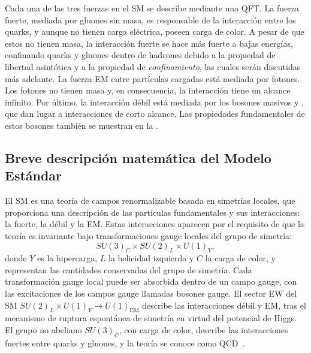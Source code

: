 Cada una de las tres fuerzas en el \ac{SM} se describe mediante una \ac{QFT}.
La fuerza fuerte, mediada por gluones sin masa, es responsable de la interacci\'on entre los quarks, y aunque no tienen carga eléctrica, poseen carga de color. A pesar de que estos no tienen masa, la interacción fuerte se hace más fuerte a bajas energías, confinando quarks y gluones dentro de hadrones debido a la propiedad de libertad asintótica y a la propiedad de \textit{confinamiento}, las cuales ser\'an discutidas m\'as adelante.
La fuerza \ac{EM} entre partículas cargadas está mediada por fotones. Los fotones no tienen masa y, en consecuencia, la interacción tiene un alcance infinito.
Por último, la interacción débil está mediada por los bosones masivos \Wboson y \Zboson, que dan lugar a interacciones de corto alcance. Las propiedades fundamentales de estos bosones también se muestran en la \Fig{\ref{fig:theory:sm:particles_interaction:particles}}.









\subsection{Breve descripci\'on matem\'atica del Modelo Est\'andar}
\label{subsec:theory:sm:mathematical}

El \ac{SM} es una teoría de campos renormalizable basada en simetrías locales, que proporciona una descripción de las partículas fundamentales y sus interacciones: la fuerte, la débil y la \ac{EM}. Estas interacciones aparecen por el requisito de que la teoría es invariante bajo transformaciones gauge locales del grupo de simetría:
\begin{equation*}
    SU(3)_{C} \times SU(2)_{L} \times U(1)_{Y},
\end{equation*}
donde \(Y\) es la hipercarga, \(L\) la helicidad izquierda y \(C\) la carga de color, y representan las cantidades conservadas del grupo de simetría. Cada transformación gauge local puede ser absorbida dentro de un campo gauge, con las excitaciones de los campos gauge llamadas bosones gauge. El sector \ac{EW} del \ac{SM} \(SU(2)_{L} \times U(1)_{Y} \to U(1)_{\text{EM}}\) describe las interacciones débil y \ac{EM}, tras el mecanismo de ruptura espontánea de simetría en virtud del potencial de Higgs. El grupo no abeliano \(SU(3)_C\), con carga de color, describe las interacciones fuertes entre quarks y gluones, y la teoría se conoce como \ac{QCD}~\cite{Ellis-1996-book}.

